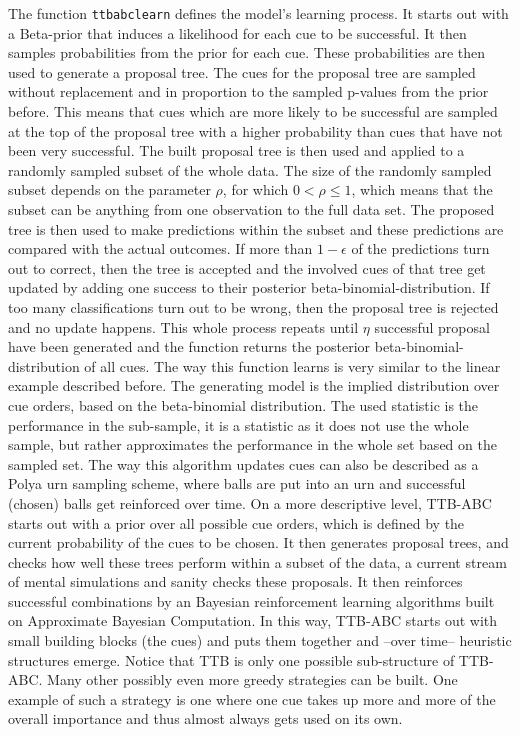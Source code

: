 \documentclass[a4paper,man, natbib]{apa6}
\begin{document}
The function \texttt{ttbabclearn} defines the model's learning process. It starts out with a Beta-prior that induces a likelihood for each cue to be successful. It then samples probabilities from the prior for each cue. These probabilities are then used to generate a proposal tree. The cues for the proposal tree are sampled without replacement and in proportion to the sampled p-values from the prior before. This means that cues which are more likely to be successful are sampled at the top of the proposal tree with a higher probability than cues that have not been very successful. The built proposal tree is then used and applied to a randomly sampled subset of the whole data. The size of the randomly sampled subset depends on the parameter $\rho$, for which $0<\rho\leq1$, which means that the subset can be anything from one observation to the full data set. The proposed tree is then used to make predictions within the subset and these predictions are compared with the actual outcomes. If more than $1-\epsilon$ of the predictions turn out to correct, then the tree is accepted and the involved cues of that tree get updated by adding one success to their posterior beta-binomial-distribution. If too many classifications turn out to be wrong, then the proposal tree is rejected and no update happens. This whole process repeats until $\eta$ successful proposal have been generated and the function returns the posterior beta-binomial-distribution of all cues.
The way this function learns is very similar to the linear example described before. The generating model is the implied distribution over cue orders, based on the beta-binomial distribution. The used statistic is the performance in the sub-sample, it is a statistic as it does not use the whole sample, but rather approximates the performance in the whole set based on the sampled set. The way this algorithm updates cues can also be described as a Polya urn sampling scheme, where balls are put into an urn and successful (chosen) balls get reinforced over time. On a more descriptive level, TTB-ABC starts out with a prior over all possible cue orders, which is defined by the current probability of the cues to be chosen. It then generates proposal trees, and checks how well these trees perform within a subset of the data, a current stream of mental simulations and sanity checks these proposals. It then reinforces successful combinations by an Bayesian reinforcement learning algorithms \citep{poupart2010bayesian} built on Approximate Bayesian Computation. In this way, TTB-ABC starts out with small building blocks (the cues) and puts them together and --over time-- heuristic structures emerge. Notice that TTB is only one possible sub-structure of TTB-ABC. Many other possibly even more greedy strategies can be built. One example of such a strategy is one where one cue takes up more and more of the overall importance and thus almost always gets used on its own.
\end{document}
